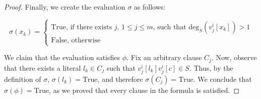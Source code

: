 \documentclass[en]{pracamgr}
\theoremstyle{definition}
\newcommand{\degree}[2]{\textrm{deg}_{#1}(#2)}
\newcommand{\true}{\textrm{True}}
\begin{document}
\begin{proof}
	\noindent
	Finally, we create the evaluation $\sigma$ as follows:
	
	\begin{equation*}
	\sigma(x_k) = 
	\begin{cases}
	\textrm{True}\text{, if there exists $j$, $1 \leq j \leq m$, such that $\degree{S}{v^i_j[x_k]} > 1$} \\
	\textrm{False}\text{, otherwise}
	\end{cases}
	\end{equation*}
	
	\noindent
	We claim that the evaluation satisfies $\phi$. Fix an arbitrary clause $C_j$. Now, observe that there exists a literal $l_k \in C_j$ such that $v^i_j[l_k]v^i_j[c] \in S$. Thus, by the definition of $\sigma$, $\sigma(l_k)=\true$, and therefore $\sigma(C_j)=\true$. We conclude that $\sigma(\phi)=\true$, as we proved that every clause in the formula is satisfied.\qedhere
\end{proof}

 

\end{document}

